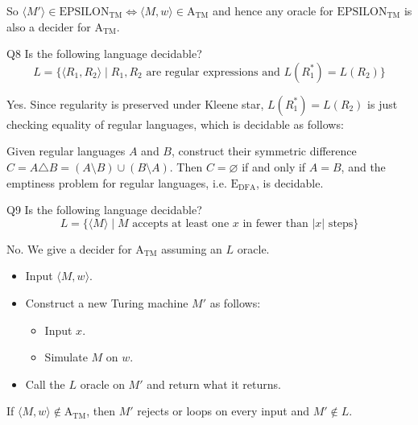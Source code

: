 \documentclass{article}
\theoremstyle{definition}
\theoremstyle{definition}
\theoremstyle{remark}
\begin{document}
So $\langle M'\rangle\in\text{EPSILON}_\text{TM}\Longleftrightarrow\langle M,w\rangle\in\text{A}_\text{TM}$ and hence any oracle for $\text{EPSILON}_\text{TM}$ is also a decider for $\text{A}_\text{TM}$.





\begin{questionbox}{Q8}
    Is the following language decidable?
    \begin{equation*}
        L=\bigl\{\langle R_1,R_2\rangle\mid R_1,R_2\text{ are regular expressions and }L(R_1^\ast)=L(R_2)\bigr\}
    \end{equation*}
\end{questionbox}

\bigskip

Yes. Since regularity is preserved under Kleene star, $L(R_1^\ast)=L(R_2)$ is just checking equality of regular languages, which is decidable as follows:

Given regular languages $A$ and $B$, construct their symmetric difference $C=A\triangle B=(A\setminus B)\cup(B\setminus A)$. Then $C=\varnothing$ if and only if $A=B$, and the emptiness problem for regular languages, i.e. $\text{E}_\text{DFA}$, is decidable.


\begin{questionbox}{Q9}
    Is the following language decidable?
    \begin{equation*}
        L=\bigl\{\langle M\rangle\mid M\text{ accepts at least one }x\text{ in fewer than }|x|\text{ steps}\bigr\}
    \end{equation*}
\end{questionbox}

\bigskip

No. We give a decider for $\text{A}_\text{TM}$ assuming an $L$ oracle.
\begin{itemize}
    \item[(1)] Input $\langle M,w\rangle$.
    \item[(2)] Construct a new Turing machine $M'$ as follows:
    \begin{itemize}
        \item Input $x$.
        \item Simulate $M$ on $w$.
    \end{itemize}
    \item[(3)] Call the $L$ oracle on $M'$ and return what it returns.
\end{itemize}
If $\langle M,w\rangle\notin\text{A}_\text{TM}$, then $M'$ rejects or loops on every input and $M'\notin L$.
\end{document}
